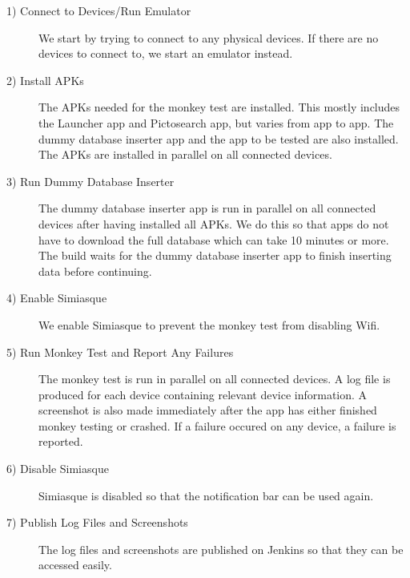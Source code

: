 \begin{description}
  \item[1) Connect to Devices/Run Emulator] We start by trying to connect to any physical devices. If there are no devices to connect to, we start an emulator instead.
  \item[2) Install APKs] The APKs needed for the monkey test are installed. This mostly includes the Launcher app and Pictosearch app, but varies from app to app. The dummy database inserter app and the app to be tested are also installed. The APKs are installed in parallel on all connected devices.
  \item[3) Run Dummy Database Inserter] The dummy database inserter app is run in parallel on all connected devices after having installed all APKs. We do this so that apps do not have to download the full database which can take 10 minutes or more. The build waits for the dummy database inserter app to finish inserting data before continuing.
  \item[4) Enable Simiasque] We enable Simiasque to prevent the monkey test from disabling Wifi.
  \item[5) Run Monkey Test and Report Any Failures] The monkey test is run in parallel on all connected devices. A log file is produced for each device containing relevant device information. A screenshot is also made immediately after the app has either finished monkey testing or crashed. If a failure occured on any device, a failure is reported. 
  \item[6) Disable Simiasque] Simiasque is disabled so that the notification bar can be used again.
  \item[7) Publish Log Files and Screenshots] The log files and screenshots are published on Jenkins so that they can be accessed easily.
\end{description}